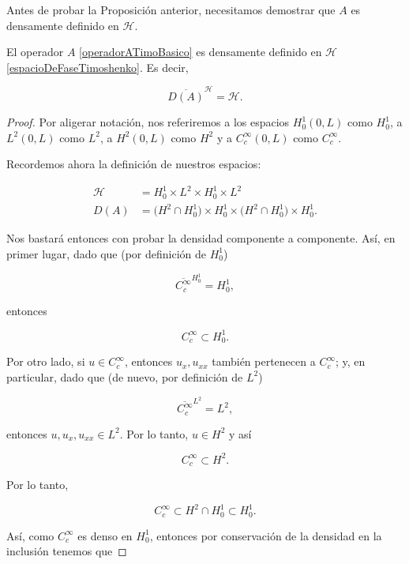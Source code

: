 Antes de probar la Proposición anterior, necesitamos demostrar que $A$ es densamente definido en $\mathcal{H}$.\\

\begin{Proposicion}
\label{ch:teoriaVigas:prop:AesDensamenteDef}

    El operador $A$ \eqref{operadorATimoBasico} es densamente definido en $\mathcal{H}$ \eqref{espacioDeFaseTimoshenko}. Es decir,

    \[\overline{D(A)}^{\mathcal{H}} = \mathcal{H}.\]
\end{Proposicion}

\begin{proof}

    Por aligerar notación, nos referiremos a los espacios $H_0^1(0,L)$ como $H_0^1$, a $L^2(0,L)$ como $L^2$, a $H^2(0,L)$ como $H^2$ y a $C_c^{\infty}(0,L)$ como $C_c^{\infty}$.

    Recordemos ahora la definición de nuestros espacios:

    \begin{align}
        \mathcal{H} &= H_0^1 \times L^2 \times H_0^1 \times L^2\\
        D(A) &= \big(H^2 \cap H_0^1\big) \times H_0^1 \times \big(H^2 \cap H_0^1\big) \times H_0^1.
    \end{align}
    
    Nos bastará entonces con probar la densidad componente a componente. Así, en primer lugar, dado que (por definición de $H_0^1$)

    \[\overline{C_c^{\infty}}^{H_0^1} = H_0^1,\]

    entonces

    \[C_c^{\infty} \subset H_0^1.\]

    Por otro lado, si $u \in C_c^{\infty}$, entonces $u_x, u_{xx}$ también pertenecen a $C_c^{\infty}$; y, en particular, dado que (de nuevo, por definición de $L^2$)

    \[\overline{C_c^{\infty}}^{L^2} = L^2,\]

    entonces $u, u_x, u_{xx} \in L^2$. Por lo tanto, $u \in H^2$ y así

    \[C_c^{\infty} \subset H^2.\]

    Por lo tanto,

    \[C_c^{\infty} \subset H^2 \cap H_0^1 \subset H_0^1.\]

    Así, como $C_c^\infty$ es denso en $H_0^1$, entonces por conservación de la densidad en la inclusión tenemos que


\end{proof}
